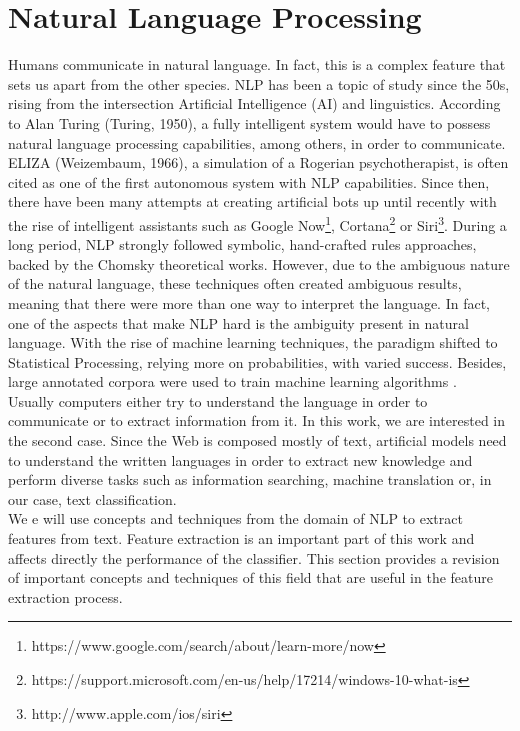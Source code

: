 \section{Natural Language Processing}
Humans communicate in natural language. In fact, this is a complex feature that sets us apart from the other species. NLP has been a topic of study since the 50s, rising from the intersection Artificial Intelligence (AI) and linguistics. According to Alan Turing (Turing, 1950), a fully intelligent system would have to possess natural language processing capabilities, among others, in order to communicate. ELIZA (Weizembaum, 1966), a simulation of a Rogerian psychotherapist, is often cited as one of the first autonomous system with NLP capabilities. Since then, there have been many attempts at creating artificial bots up until recently with the rise of intelligent assistants such as Google Now\footnote{https://www.google.com/search/about/learn-more/now}, Cortana\footnote{https://support.microsoft.com/en-us/help/17214/windows-10-what-is} or Siri\footnote{http://www.apple.com/ios/siri}. During a long period, NLP strongly followed symbolic, hand-crafted rules approaches, backed by the Chomsky theoretical works. However, due to the ambiguous nature of the natural language, these techniques often created ambiguous results, meaning that there were more than one way to interpret the language. In fact, one of the aspects that make NLP hard is the ambiguity present in natural language. With the rise of machine learning techniques, the paradigm shifted to Statistical Processing, relying more on probabilities, with varied success. Besides, large annotated corpora were used to train machine learning algorithms \citep{nadkarni2011NLPIntro}.\\
Usually computers either try to understand the language in order to communicate or to extract information from it. In this work, we are interested in the second case. Since the Web is composed mostly of text, artificial models need to understand the written languages in order to extract new knowledge and perform diverse tasks such as information searching, machine translation or, in our case, text classification. \\
We e will use concepts and techniques from the domain of NLP to extract features from text. Feature extraction is an important part of this work and affects directly the performance of the classifier. This section provides a revision of important concepts and techniques of this field that are useful in the feature extraction process. 

